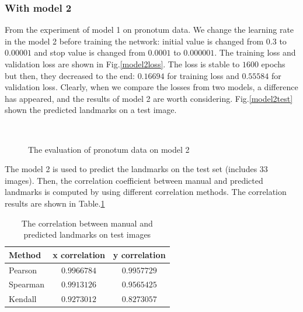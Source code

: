 \documentclass[12pt,a4paper]{article}
\begin{document}
\subsubsection{With model 2}
From the experiment of model 1 on pronotum data. We change the learning rate in the model 2 before training the network: initial value is changed from $0.3$ to $0.00001$ and stop value is changed from $0.0001$ to $0.000001$. The training loss and validation loss are shown in Fig.\ref{model2loss}. The loss is stable to $1600$ epochs but then, they decreased to the end: $0.16694$ for training loss and $0.55584$ for validation loss. Clearly, when we compare the losses from two models, a difference has appeared, and the results of model 2 are worth considering. Fig.\ref{model2test} shown the predicted landmarks on a test image.
\begin{figure}[h!]
\centering
{}~~
\caption{The evaluation of pronotum data on model 2}
\label{model2tl}
\end{figure}
The model 2 is used to predict the landmarks on the test set (includes 33 images). Then, the correlation coefficient between manual and predicted landmarks is computed by using different correlation methods\cite{pallant2013spss,myers2010research,kendall1938new}. The correlation results are shown in Table.\ref{corr1}
\begin{table}[h!]
	\centering
	\begin{tabular}{l c c}
		Method & x correlation & y correlation \\ \hline
		Pearson & $0.9966784$ & $0.9957729$ \\ \hline
		Spearman & $0.9913126$ & $0.9565425$ \\ \hline
		Kendall & $0.9273012$ & $0.8273057$ \\ \hline
	\end{tabular}
	\caption{The correlation between manual and predicted landmarks on test images}
	\label{corr1}
\end{table}~\\
\end{document}
